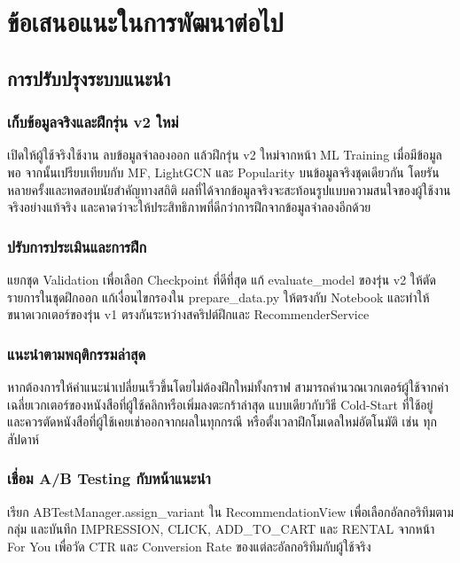 \section{ข้อเสนอแนะในการพัฒนาต่อไป}

\subsection{การปรับปรุงระบบแนะนำ}

\subsubsection{เก็บข้อมูลจริงและฝึกรุ่น v2 ใหม่}
เปิดให้ผู้ใช้จริงใช้งาน ลบข้อมูลจำลองออก แล้วฝึกรุ่น v2 ใหม่จากหน้า ML Training เมื่อมีข้อมูลพอ จากนั้นเปรียบเทียบกับ MF, LightGCN และ Popularity บนข้อมูลจริงชุดเดียวกัน โดยรันหลายครั้งและทดสอบนัยสำคัญทางสถิติ ผลที่ได้จากข้อมูลจริงจะสะท้อนรูปแบบความสนใจของผู้ใช้งานจริงอย่างแท้จริง และคาดว่าจะให้ประสิทธิภาพที่ดีกว่าการฝึกจากข้อมูลจำลองอีกด้วย

\subsubsection{ปรับการประเมินและการฝึก}
แยกชุด Validation เพื่อเลือก Checkpoint ที่ดีที่สุด แก้ evaluate\_model ของรุ่น v2 ให้ตัดรายการในชุดฝึกออก แก้เงื่อนไขกรองใน prepare\_data.py ให้ตรงกับ Notebook และทำให้ขนาดเวกเตอร์ของรุ่น v1 ตรงกันระหว่างสคริปต์ฝึกและ RecommenderService

\subsubsection{แนะนำตามพฤติกรรมล่าสุด}
หากต้องการให้คำแนะนำเปลี่ยนเร็วขึ้นโดยไม่ต้องฝึกใหม่ทั้งกราฟ สามารถคำนวณเวกเตอร์ผู้ใช้จากค่าเฉลี่ยเวกเตอร์ของหนังสือที่ผู้ใช้คลิกหรือเพิ่มลงตะกร้าล่าสุด แบบเดียวกับวิธี Cold-Start ที่ใช้อยู่ และควรตัดหนังสือที่ผู้ใช้เคยเช่าออกจากผลในทุกกรณี หรือตั้งเวลาฝึกโมเดลใหม่อัตโนมัติ เช่น ทุกสัปดาห์

\subsubsection{เชื่อม A/B Testing กับหน้าแนะนำ}
เรียก ABTestManager.assign\_variant ใน RecommendationView เพื่อเลือกอัลกอริทึมตามกลุ่ม และบันทึก IMPRESSION, CLICK, ADD\_TO\_CART และ RENTAL จากหน้า For You เพื่อวัด CTR และ Conversion Rate ของแต่ละอัลกอริทึมกับผู้ใช้จริง

